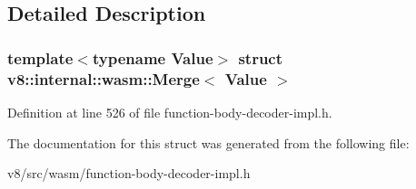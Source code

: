 \subsection{Detailed Description}
\subsubsection*{template$<$typename Value$>$\newline
struct v8\+::internal\+::wasm\+::\+Merge$<$ Value $>$}



Definition at line 526 of file function-\/body-\/decoder-\/impl.\+h.



The documentation for this struct was generated from the following file\+:\begin{DoxyCompactItemize}
\item 
v8/src/wasm/function-\/body-\/decoder-\/impl.\+h\end{DoxyCompactItemize}
